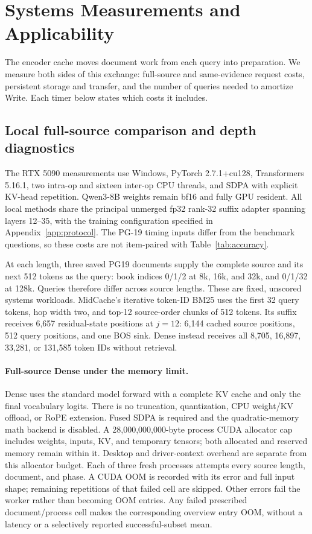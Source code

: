 \FloatBarrier
\section{Systems Measurements and Applicability}
\label{app:systems}
The encoder cache moves document work from each query into preparation. We measure both sides of this exchange: full-source and same-evidence request costs, persistent storage and transfer, and the number of queries needed to amortize Write. Each timer below states which costs it includes.
\subsection{Local full-source comparison and depth diagnostics}
\label{app:local-infra}

The RTX 5090 measurements use Windows, PyTorch 2.7.1+cu128, Transformers 5.16.1, two intra-op and sixteen inter-op CPU threads, and SDPA with explicit KV-head repetition. Qwen3-8B weights remain bf16 and fully GPU resident. All local methods share the principal unmerged fp32 rank-32 suffix adapter spanning layers 12--35, with the training configuration specified in Appendix~\ref{app:protocol}. The PG-19 timing inputs differ from the benchmark questions, so these costs are not item-paired with Table~\ref{tab:accuracy}.

At each length, three saved PG19 documents supply the complete source and its next 512 tokens as the query: book indices 0/1/2 at 8k, 16k, and 32k, and 0/1/32 at 128k. Queries therefore differ across source lengths. These are fixed, unscored systems workloads. MidCache's iterative token-ID BM25 uses the first 32 query tokens, hop width two, and top-12 source-order chunks of 512 tokens. Its suffix receives 6,657 residual-state positions at $j=12$: 6,144 cached source positions, 512 query positions, and one BOS sink. Dense instead receives all 8,705, 16,897, 33,281, or 131,585 token IDs without retrieval.

\paragraph{Full-source Dense under the memory limit.}
\label{app:local-dense28}

Dense uses the standard model forward with a complete KV cache and only the final vocabulary logits. There is no truncation, quantization, CPU weight/KV offload, or RoPE extension. Fused SDPA is required and the quadratic-memory math backend is disabled. A 28,000,000,000-byte process CUDA allocator cap includes weights, inputs, KV, and temporary tensors; both allocated and reserved memory remain within it. Desktop and driver-context overhead are separate from this allocator budget. Each of three fresh processes attempts every source length, document, and phase. A CUDA OOM is recorded with its error and full input shape; remaining repetitions of that failed cell are skipped. Other errors fail the worker rather than becoming OOM entries. Any failed prescribed document/process cell makes the corresponding overview entry OOM, without a latency or a selectively reported successful-subset mean.

